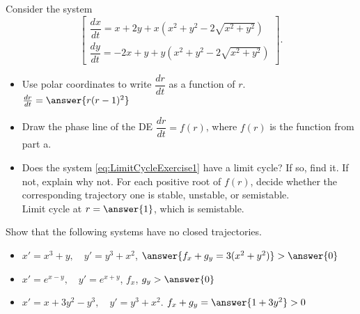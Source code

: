 \documentclass{ximera}
\begin{document}
\begin{exercise}
    Consider the system %
    \begin{equation}
        \begin{bmatrix}
            \dfrac{dx}{dt}=x+2y+x(x^2+y^2-2\sqrt{x^2+y^2})\\[6pt]
            \dfrac{dy}{dt}=-2x+y+y(x^2+y^2-2\sqrt{x^2+y^2})
        \end{bmatrix}. \label{eq:LimitCycleExercise1}
    \end{equation}
    \begin{itemize}
        \item Use polar coordinates to write $\dfrac{dr}{dt}$ as a function of $r$.\\
            $\frac{dr}{dt} = \answer{r(r-1)^2}$
        \item Draw the phase line of the DE $\dfrac{dr}{dt}=f(r)$, where $f(r)$ is the function from part a.
        \item Does the system \eqref{eq:LimitCycleExercise1} have a limit cycle? If so, find it. If not, explain why not. For each positive root of $f(r)$, decide whether the corresponding trajectory one is stable, unstable, or semistable.\\
        Limit cycle at $r = \answer{1}$, which is semistable.
    \end{itemize}
\end{exercise}

\begin{exercise}
    Show that the following systems have no closed trajectories.
    \begin{itemize}
        \item $x'=x^3+y,\quad y'=y^3+x^2$, $\answer{f_x + g_y = 3(x^2 + y^2)} > \answer{0}$
        \item $x'=e^{x-y},\quad y'=e^{x+y}$, $f_x$, $g_y > \answer{0}$
        \item $x'=x+3y^2-y^3,\quad y'=y^3+x^2$. $f_x + g_y = \answer{1 + 3y^2} > 0$
    \end{itemize}
\end{exercise}
\end{document}
